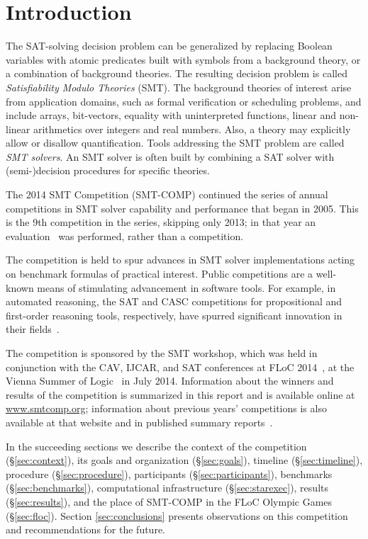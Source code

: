 \documentclass[twoside,11pt]{article}
\begin{document}
	
\section{Introduction}
\label{sec:intro}

The SAT-solving decision problem can be generalized by replacing
Boolean variables with atomic predicates built with symbols from a
background theory, or a combination of background theories. The
resulting decision problem is called \emph{Satisfiability Modulo
  Theories\/} (SMT). The background theories of interest arise from 
	application domains, such as formal verification or scheduling problems, and include arrays,
bit-vectors, equality with uninterpreted functions, linear and
non-linear arithmetics over integers and real numbers. Also, a theory
may explicitly allow or disallow quantification. Tools addressing the
SMT problem are called \emph{SMT solvers\/}. An SMT solver is often
built by combining a SAT solver with (semi-)decision procedures for
specific theories.

The 2014 SMT Competition (SMT-COMP) continued the series of annual competitions in SMT solver capability and performance that began in 2005. This is the 9th competition in the series, skipping only 2013; in that year an evaluation~\cite{it:2014-017} was performed, rather than a competition.

The competition is held to spur advances in
SMT solver implementations acting on benchmark formulas of practical interest. Public competitions are
a well-known means of stimulating advancement in software tools. For example, in automated
reasoning, the SAT and CASC competitions for propositional and first-order reasoning tools, respectively,
have spurred significant innovation in their fields~\cite{leberre+03,PSS02}.

The competition is sponsored by the SMT workshop, which was held in conjunction with the
CAV, IJCAR, and SAT conferences at FLoC 2014~\cite{FLoC2014}, at the Vienna Summer of Logic~\cite{VSL} in July 2014.
Information about the winners
and results of the competition is summarized in this report and is available online at \url{www.smtcomp.org}; information
about previous years' competitions is also available at that website and in published summary reports~\cite{springerlink:10.1007/s10817-012-9246-5,DBLP:conf/cade/CokGBD12,it:2014-017}.

In the succeeding sections we describe the context of the competition (\S\ref{sec:context}), its goals and organization (\S\ref{sec:goals}), timeline (\S\ref{sec:timeline}), procedure (\S\ref{sec:procedure}), participants (\S\ref{sec:participants}), benchmarks (\S\ref{sec:benchmarks}), computational infrastructure (\S\ref{sec:starexec}), results (\S\ref{sec:results}), and the place of SMT-COMP in the FLoC Olympic Games (\S\ref{sec:floc}). Section \ref{sec:conclusions} presents observations on this competition and recommendations for the future.
\end{document}
